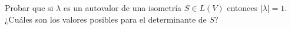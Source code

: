 \item Probar que si $\lambda$ es un autovalor de una isometría $S\in L(V)$ entonces $|\lambda|=1$. ¿Cuáles son los valores posibles para el determinante de $S$?
    \begin{mdframed}[style=s]
        
    \end{mdframed}